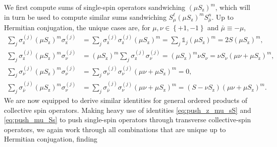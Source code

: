 \documentclass[aps,notitlepage,nofootinbib,11pt]{revtex4-1}
\newcommand{\p}[1]{\left(#1\right)} %
\renewcommand{\set}[1]{\left\{#1\right\}} %
\newcommand{\z}{\text{z}}
\newcommand{\bmu}{{\bar\mu}}
\newcommand{\bnu}{{\bar\nu}}
\newcommand{\1}{\mathds{1}}
\begin{document}
We first compute sums of single-spin operators sandwiching
$\p{\mu S_\z}^m$, which will in turn be used to compute similar sums
sandwiching $S_\mu^\ell \p{\mu S_\z}^m S_\bmu^n$.  Up to Hermitian
conjugation, the unique cases are, for $\mu,\nu\in\set{+1,-1}$ and
$\bmu\equiv-\mu$,
\begin{align}
  \sum_j \sigma_\z^{(j)} \p{\mu S_\z}^m \sigma_\z^{(j)}
  &= \sum_j \sigma_\z^{(j)} \sigma_\z^{(j)} \p{\mu S_\z}^m
  = \sum_j \1_j \p{\mu S_\z}^m
  = 2 S \p{\mu S_\z}^m, \\
  \sum_j \sigma_\z^{(j)} \p{\mu S_\z}^m \sigma_\nu^{(j)}
  &= \p{\mu S_\z}^m \sum_j \sigma_\z^{(j)} \sigma_\nu^{(j)}
  = \p{\mu S_\z}^m \nu S_\nu
  = \nu S_\nu \p{\mu\nu+\mu S_\z}^m, \\
  \sum_j \sigma_\nu^{(j)} \p{\mu S_\z}^m \sigma_\nu^{(j)}
  &= \sum_j \sigma_\nu^{(j)} \sigma_\nu^{(j)} \p{\mu\nu+\mu S_\z}^m
  = 0, \\
  \sum_j \sigma_\bnu^{(j)} \p{\mu S_\z}^m \sigma_\nu^{(j)}
  &= \sum_j \sigma_\bnu^{(j)} \sigma_\nu^{(j)} \p{\mu\nu+\mu S_\z}^m
  = \p{S-\nu S_\z} \p{\mu\nu+\mu S_\z}^m.
\end{align}
We are now equipped to derive similar identities for general ordered
products of collective spin operators.  Making heavy use of identities
\eqref{eq:push_z_mu_sS} and \eqref{eq:push_mu_Ss} to push single-spin
operators through transverse collective-spin operators, we again work
through all combinations that are unique up to Hermitian conjugation,
finding
\end{document}
